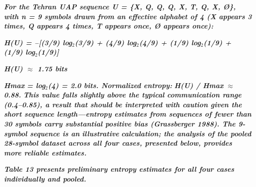 \documentclass[11pt,letterpaper]{article}
\begin{document}
\textbf{\textit{For the Tehran UAP sequence U = \{X, Q, Q, Q, X, T, Q, X, {\O}\}, with n = 9 symbols drawn from an effective alphabet of 4 (X appears 3 times, Q appears 4 times, T appears once, {\O} appears once):}}


\textbf{\textit{H(U) = --[(3/9) log$_2$(3/9) + (4/9) log$_2$(4/9) + (1/9) log$_2$(1/9) + (1/9) log$_2$(1/9)]}}


\textbf{\textit{H(U) $\approx$ 1.75 bits}}


\textbf{\textit{H}}\textbf{\textit{max}}\textbf{\textit{ = log$_2$(4) = 2.0 bits. Normalized entropy: }}\textbf{\textit{H(U) / H}}\textbf{\textit{max}}\textbf{\textit{ $\approx$ 0.88.}}\textbf{\textit{ This value falls slightly above the typical communication range (0.4--0.85), a result that should be interpreted with caution given the short sequence length---entropy estimates from sequences of fewer than 30 symbols carry substantial positive bias (Grassberger 1988). The 9-symbol sequence is an }}\textbf{\textit{illustrative}}\textbf{\textit{ calculation; the analysis of the pooled 28-symbol dataset across all four cases, presented below, provides more reliable estimates.}}


\textbf{\textit{Table 13 presents preliminary entropy estimates for all four cases individually and pooled.}}


\begin{table}[H]
\centering
\small
{}
\caption*{\small\textit{Table 13. Shannon entropy estimates for UAP behavioral sequences. Pooled estimate is the primary result.}}
\end{table}
\end{document}
